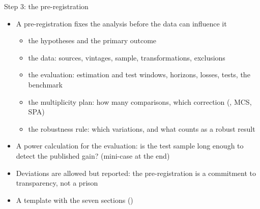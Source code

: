 \begin{frame}{Step 3: the pre-registration}
\itemsize{\small}
\begin{itemize}
    \item A pre-registration fixes the analysis before the data can influence it 
    \begin{itemize}
        \item the hypotheses and the primary outcome
        \item the data: sources, vintages, sample, transformations, exclusions
        \item the evaluation: estimation and test windows, horizons, losses, tests, the benchmark
        \item the multiplicity plan: how many comparisons, which correction (, MCS, SPA)
        \item the robustness rule: which variations, and what counts as a robust result
    \end{itemize}
    \item A power calculation for the evaluation: is the test sample long enough to detect the published gain? (mini-case at the end)
    \item Deviations are allowed but reported: the pre-registration is a commitment to transparency, not a prison
    \item A template with the seven sections () %
\end{itemize}
\end{frame}

